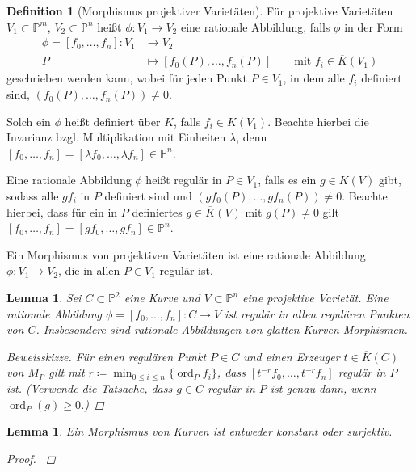 \documentclass[english, german, parskip=half]{scrartcl}
\newtheorem{Lemma}[Satz]{Lemma}
\theoremstyle{definition}
\newtheorem{Definition}[Satz]{Definition}
\theoremstyle{remark}
\newcommand*{\K}{\ensuremath{K}} %
\newcommand*{\algK}{\ensuremath{\overline K}} %
\renewcommand*{\P}{\ensuremath{\mathds{P}}} %
\newcommand*{\longto}{\longrightarrow}
\DeclareMathOperator{\ord}{ord} %
\begin{document}
\begin{Definition}[Morphismus projektiver Varietäten]
  Für projektive Varietäten $V_1\subset\P^m$, $V_2\subset\P^n$ heißt
  $\phi\colon V_1\to V_2$ eine rationale Abbildung,
  falls $\phi$ in der Form
  \begin{align*}
    \phi = [f_0,\dotsc, f_n]\colon V_1 &\longto V_2\\
    P &\longmapsto \left[f_0(P), \dotsc, f_n(P)\right] 
        \qquad \text{mit } f_i\in\algK(V_1)
  \end{align*}
  geschrieben werden kann, 
  wobei für jeden Punkt $P\in V_1$, 
  in dem alle $f_i$ definiert sind, %
  $(f_0(P),\dotsc,f_n(P))\neq0$. %
  
  Solch ein $\phi$ heißt definiert über $\K$,%
  falls $f_i\in\K(V_1)$. Beachte hierbei die Invarianz
  bzgl. Multiplikation mit Einheiten $\lambda$, denn
  $[f_0,\dotsc,f_n]=[\lambda f_0,\dotsc,\lambda f_n]\in\P^n$.

  Eine rationale Abbildung $\phi$ heißt regulär in $P\in V_1$,
  falls es ein $g\in\algK(V)$ gibt, sodass
  alle $gf_i$ in $P$ definiert sind 
  und $(gf_0(P),\dotsc,gf_n(P))\neq0$.
  Beachte hierbei, 
  dass für ein in $P$ definiertes $g\in\algK(V)$ mit $g(P)\neq0$ gilt
  $[f_0,\dotsc,f_n]=[gf_0,\dotsc, gf_n]\in\P^n$.
  
  Ein Morphismus von projektiven Varietäten ist eine rationale
  Abbildung $\phi\colon V_1\to V_2$, die in allen $P\in V_1$ regulär
  ist.
\end{Definition}

\begin{Lemma}\label{ratabbglattekurven}
  Sei $C\subset\P^2$ eine Kurve und $V\subset\P^n$ eine projektive
  Varietät. 
  Eine rationale Abbildung $\phi=[f_0,\dotsc, f_n]\colon C\to V$ ist
  regulär in allen regulären Punkten von $C$.
  Insbesondere sind rationale Abbildungen von glatten Kurven
  Morphismen.
  \begin{proof}[Beweisskizze]
    Für einen regulären Punkt $P\in C$ und einen Erzeuger
    $t\in\algK(C)$ von $M_P$ gilt mit 
    $r\coloneqq\min_{0\leq i\leq n}\{\ord_Pf_i\}$,
    dass $[t^{-r}f_0,\dotsc,t^{-r}f_n]$ regulär in $P$ ist.
    (Verwende die Tatsache, dass $g\in C$ regulär in $P$ ist
    genau dann, wenn $\ord_P(g)\geq0$.)
  \end{proof}
\end{Lemma}

\begin{Lemma}\label{morphismensurj}
  Ein Morphismus von Kurven ist entweder konstant oder surjektiv.
  \begin{proof}
    \cite[siehe][Theorem 2.3]{silverman}
  \end{proof}
\end{Lemma}
\end{document}
